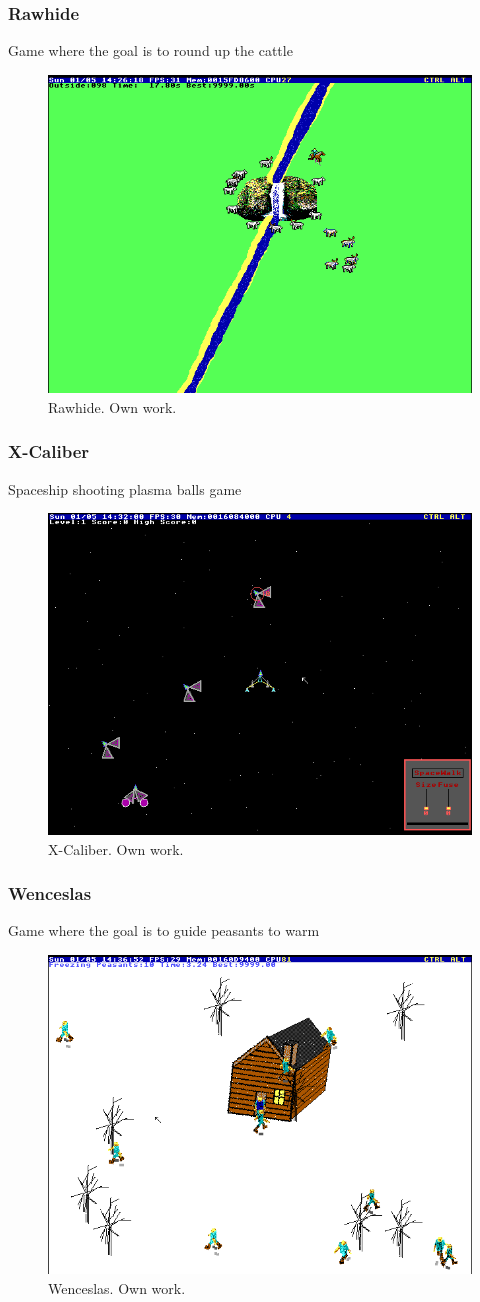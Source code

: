 \documentclass{beamer}
\begin{document}
	\begin{frame}
		\frametitle{Rawhide}
		Game where the goal is to round up the cattle
		\begin{figure}
			\centering
			\includegraphics[width=0.6\linewidth]{images/rawhide.png}
			\caption{Rawhide. Own work.}
			\label{fig:rawhide}
		\end{figure}
	\end{frame}

	\begin{frame}
		\frametitle{X-Caliber}
		Spaceship shooting plasma balls game
		\begin{figure}
			\centering
			\includegraphics[width=0.6\linewidth]{images/xcaliber.png}
			\caption{X-Caliber. Own work.}
			\label{fig:xcaliber}
		\end{figure}
	\end{frame}

	\begin{frame}
		\frametitle{Wenceslas}
		Game where the goal is to guide peasants to warm
		\begin{figure}
			\centering
			\includegraphics[width=0.6\linewidth]{images/wenceslas.png}
			\caption{Wenceslas. Own work.}
			\label{fig:wenceslas}
		\end{figure}
	\end{frame}
\end{document}
